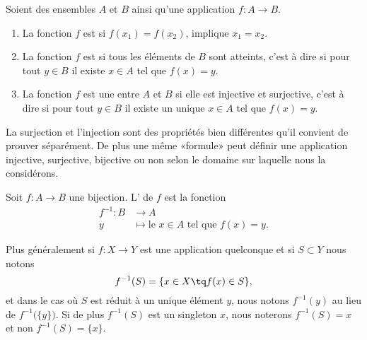 \begin{definition}        \label{DEFooBFCQooPyKvRK}
    Soient des ensembles \( A\) et \( B\) ainsi qu'une application \( f\colon A\to B\).
    \begin{enumerate}
        \item
            La fonction \( f\) est  si \( f(x_1)=f(x_2)\), implique \( x_1=x_2\).
        \item
            La fonction \( f\) est  si tous les éléments de \( B\) sont atteints, c'est à dire si pour tout \( y\in B\) il existe \( x\in A\) tel que \( f(x)=y\).
        \item
            La fonction \( f\) est une  entre \( A\) et \( B\) si elle est injective et surjective, c'est à dire si pour tout \( y\in B\) il existe un unique \( x\in A\) tel que \( f(x)=y\).
    \end{enumerate}
\end{definition}
La surjection et l'injection sont des propriétés bien différentes qu'il convient de prouver séparément. De plus une même «formule» peut définir une application injective, surjective, bijective ou non selon le domaine sur laquelle nous la considérons.

\begin{definition}      \label{DEFooTRGYooRxORpY}
    Soit \( f\colon A\to B\) une bijection. L' de \( f\) est la fonction
    \begin{equation}
        \begin{aligned}
            f^{-1}\colon B&\to A \\
            y&\mapsto \text{le } x\in A\text{ tel que } f(x)=y. 
        \end{aligned}
    \end{equation}
\end{definition}

Plus généralement si \( f\colon X\to Y\) est une application quelconque et si \( S\subset Y\) nous notons
\begin{equation}
    f^{-1}(S)=\{ x\in X\tq f(x)\in S \},
\end{equation}
et dans le cas où \( S\) est réduit à un unique élément \( y\), nous notons \( f^{-1}(y)\) au lieu de \( f^{-1}\big( \{ y \} \big)\). Si de plus \( f^{-1}(S)\) est un singleton \( x\), nous noterons \( f^{-1}(S)=x\) et non \( f^{-1}(S)=\{ x \}\).

